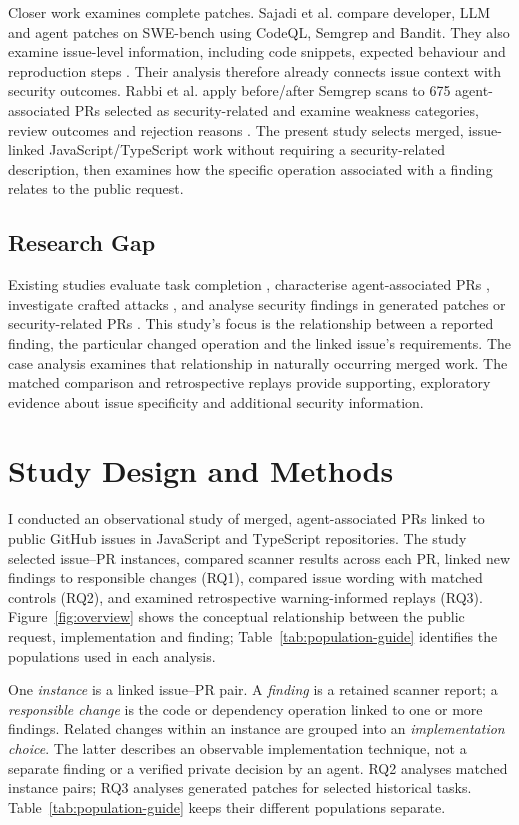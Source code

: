 \documentclass[acmsmall,screen,nonacm]{acmart}
\begin{document}
Closer work examines complete patches. Sajadi et al. compare developer, LLM and agent patches on SWE-bench using CodeQL, Semgrep and Bandit. They also examine issue-level information, including code snippets, expected behaviour and reproduction steps \cite{b48}. Their analysis therefore already connects issue context with security outcomes. Rabbi et al. apply before/after Semgrep scans to 675 agent-associated PRs selected as security-related and examine weakness categories, review outcomes and rejection reasons \cite{b49}. The present study selects merged, issue-linked JavaScript/\allowbreak TypeScript work without requiring a security-related description, then examines how the specific operation associated with a finding relates to the public request.

\subsection{Research Gap}

Existing studies evaluate task completion \cite{b9,b22}, characterise agent-associated PRs \cite{b11,b21}, investigate crafted attacks \cite{b3,b16}, and analyse security findings in generated patches or security-related PRs \cite{b48,b49}. This study's focus is the relationship between a reported finding, the particular changed operation and the linked issue's requirements. The case analysis examines that relationship in naturally occurring merged work. The matched comparison and retrospective replays provide supporting, exploratory evidence about issue specificity and additional security information.

\section{Study Design and Methods}

I conducted an observational study of merged, agent-associated PRs linked to public GitHub issues in JavaScript and TypeScript repositories. The study selected issue--PR instances, compared scanner results across each PR, linked new findings to responsible changes (RQ1), compared issue wording with matched controls (RQ2), and examined retrospective warning-informed replays (RQ3). Figure~\ref{fig:overview} shows the conceptual relationship between the public request, implementation and finding; Table~\ref{tab:population-guide} identifies the populations used in each analysis.

One \emph{instance} is a linked issue--PR pair. A \emph{finding} is a retained scanner report; a \emph{responsible change} is the code or dependency operation linked to one or more findings. Related changes within an instance are grouped into an \emph{implementation choice}. The latter describes an observable implementation technique, not a separate finding or a verified private decision by an agent. RQ2 analyses matched instance pairs; RQ3 analyses generated patches for selected historical tasks. Table~\ref{tab:population-guide} keeps their different populations separate.
\end{document}
